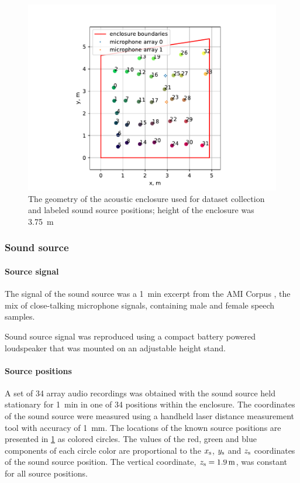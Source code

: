\documentclass[applsci,article,submit,moreauthors,pdftex]{Definitions/mdpi}
\begin{document}
\begin{figure}[h!]
	\centering
	\includegraphics[scale=0.7]{img/room_src_pos.pdf}
	\caption{The geometry of the acoustic enclosure used for \realworld{} dataset collection and labeled sound source positions; height of the enclosure was \SI{3.75}{\m}}\label{fig:room_src_pos}
\end{figure}

\subsubsection{Sound source}
\paragraph{Source signal}
The signal of the sound source was a \SI{1}{\minute} excerpt from the AMI Corpus \cite{carlettaAMIMeetingCorpus2006}, the mix of close-talking microphone signals, containing male and female speech samples.

Sound source signal was reproduced using a compact battery powered loudspeaker that was mounted on an adjustable height stand.

\paragraph{Source positions}
A set of 34 array audio recordings was obtained with the sound source held stationary for \SI{1}{\minute} in one of 34 positions within the enclosure. The coordinates of the sound source were measured using a handheld laser distance measurement tool with accuracy of \SI{1}{\mm}. The locations of the known source positions are presented in \figurename{} \ref{fig:room_src_pos} as colored circles. The values of the red, green and blue components of each circle color are proportional to the $ x_{\mathrm{s}} $, $ y_{\mathrm{s}} $ and $ z_{\mathrm{s}} $ coordinates of the sound source position.
The vertical coordinate, $ z_{\src} = \SI{1.9}{\m} $, was constant for all source positions.
\end{document}
